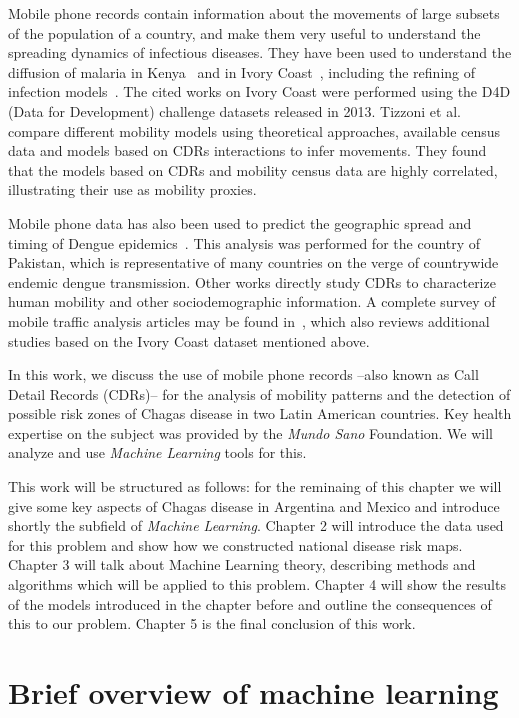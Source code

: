 Mobile phone records contain information about the movements of large subsets of the population of a country, and make them very useful to understand the spreading dynamics of infectious diseases. They have been used to understand the diffusion of malaria in Kenya~\cite{wesolowski2012quantifying} and in Ivory Coast~\cite{enns2013human}, including the refining of infection models~\cite{chunara2013large}. The cited works on Ivory Coast were performed using the D4D (Data for Development) challenge datasets released in 2013. Tizzoni et al.~\cite{tizzoni2014use} compare different mobility models using theoretical approaches, available census data and models based on CDRs interactions to infer movements. They found that the models based on CDRs and mobility census data are highly correlated, illustrating their use as mobility proxies.

Mobile phone data has also been used to predict the geographic spread and timing of Dengue epidemics~\cite{wesolowski2015impact}. This analysis was performed for the country of Pakistan, which is representative of many countries on the verge of countrywide endemic dengue transmission. Other works directly study CDRs to characterize human mobility and other sociodemographic information. A complete survey of mobile traffic analysis articles may be found in~\cite{naboulsi2015mobile}, which also reviews additional studies based on the Ivory Coast dataset mentioned above.

In this work, we discuss the use of mobile phone records --also known as Call Detail Records (CDRs)-- for the analysis of mobility patterns and the detection of possible risk zones of Chagas disease in two Latin American countries. Key health expertise on the subject was provided by the \textit{Mundo Sano} Foundation. We will analyze and use  \textit{Machine Learning} tools for this. 

This work will be structured as follows: for the reminaing of this chapter we will give some key aspects of Chagas disease in Argentina and Mexico and introduce shortly the subfield of \textit{Machine Learning}. Chapter 2 will introduce the data used for this problem and show how we constructed national disease risk maps. Chapter 3 will talk about Machine Learning theory, describing methods and algorithms which will be applied to this problem. Chapter 4 will show the results of the models introduced in the chapter before and outline the consequences of this to our problem. Chapter 5 is the final conclusion of this work.


\section{Brief overview of machine learning}

